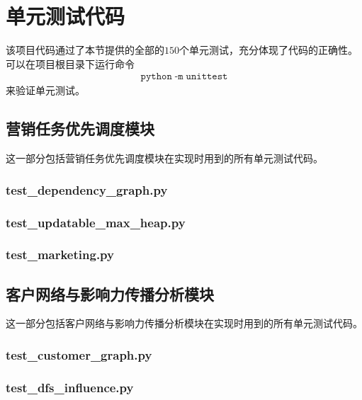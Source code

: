 \documentclass[cn,hazy,blue,10pt,normal]{elegantnote}
\begin{document}
\section{单元测试代码}
该项目代码通过了本节提供的全部的$150$个单元测试，充分体现了代码的正确性。可以在项目根目录下运行命令
\begin{align*}
    \mathtt{python \; \text{-}m \; unittest}
\end{align*}
来验证单元测试。
\label{sec: unittest}
\subsection{营销任务优先调度模块}
这一部分包括营销任务优先调度模块在实现时用到的所有单元测试代码。
\subsubsection{test\_dependency\_graph.py}


\subsubsection{test\_updatable\_max\_heap.py}


\subsubsection{test\_marketing.py}


\subsection{客户网络与影响力传播分析模块}
这一部分包括客户网络与影响力传播分析模块在实现时用到的所有单元测试代码。

\subsubsection{test\_customer\_graph.py}


\subsubsection{test\_dfs\_influence.py}

\end{document}
